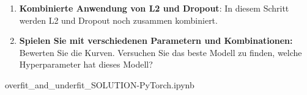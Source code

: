 \documentclass[11pt,a4paper,headinclude]{scrartcl}
\begin{document}
\begin{Aufgabe}
\begin{enumerate}
		\item \textbf{Kombinierte Anwendung von L2 und Dropout}: In diesem Schritt werden L2 und Dropout noch zusammen kombiniert. 
		
		\item \textbf{Spielen Sie mit verschiedenen Parametern und Kombinationen:} Bewerten Sie die Kurven. Versuchen Sie das beste Modell zu finden, welche Hyperparameter hat dieses Modell?
			
		
	\end{enumerate}
	
	
	\begin{Loesung}
		
		overfit\_and\_underfit\_SOLUTION-PyTorch.ipynb
		
	\end{Loesung}
	
\end{Aufgabe}






\newpage
\end{document}
